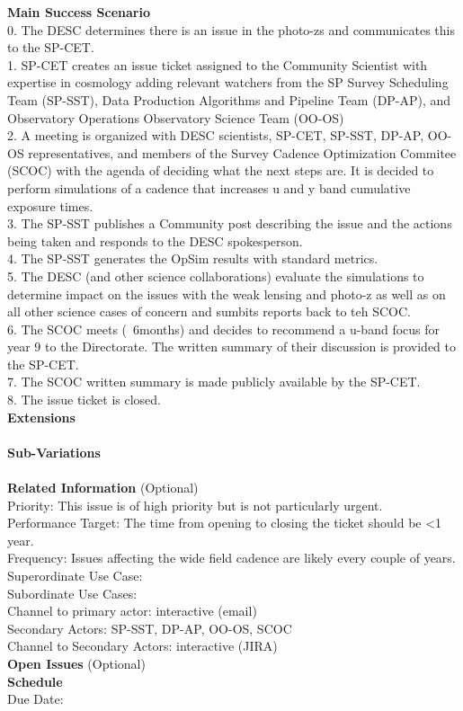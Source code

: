 {\bf Main Success Scenario} \\
0. The DESC determines there is an issue in the photo-zs and communicates this to the SP-CET. \\
1. SP-CET creates an issue ticket assigned to the Community Scientist with expertise in cosmology adding relevant watchers from the SP Survey Scheduling Team (SP-SST), Data Production Algorithms and Pipeline Team (DP-AP), and Observatory Operations Observatory Science Team (OO-OS) \\
2. A meeting is organized with DESC scientists, SP-CET, SP-SST, DP-AP, OO-OS representatives, and members of the Survey Cadence Optimization Commitee (SCOC) with the agenda of deciding what the next steps are. It is decided to perform simulations of a cadence that increases u and y band cumulative exposure times. \\
3. The SP-SST publishes a Community post describing the issue and the actions being taken and responds to the DESC spokesperson. \\
4. The SP-SST generates the OpSim results with standard metrics. \\ 
5. The DESC (and other science collaborations) evaluate the simulations to determine impact on the issues with the weak lensing and photo-z as well as on all other science cases of concern and sumbits reports back to teh SCOC. \\
6. The SCOC meets (~6months) and decides to recommend a u-band focus for year 9 to the Directorate. The written summary of their discussion is provided to the SP-CET. \\
7. The SCOC written summary is made publicly available by the SP-CET. \\
8. The issue ticket is closed. \\


{\bf Extensions} \\
\\

{\bf Sub-Variations} \\
\\

{\bf Related Information} (Optional) \\
Priority: This issue is of high priority but is not particularly urgent. \\
Performance Target: The time from opening to closing the ticket should be <1 year. \\
Frequency: Issues affecting the wide field cadence are likely every couple of years. \\
Superordinate Use Case:  \\
Subordinate Use Cases: \\
Channel to primary actor: interactive (email) \\
Secondary Actors: SP-SST, DP-AP, OO-OS, SCOC \\
Channel to Secondary Actors: interactive (JIRA) \\

{\bf Open Issues} (Optional) \\

{\bf Schedule} \\
Due Date: \\

